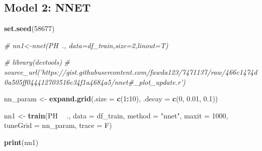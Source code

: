 \documentclass[]{report}
\newenvironment{Shaded}{\begin{snugshade}}{\end{snugshade}}
\newcommand{\CommentTok}[1]{\textcolor[rgb]{0.56,0.35,0.01}{\textit{#1}}}
\newcommand{\DataTypeTok}[1]{\textcolor[rgb]{0.13,0.29,0.53}{#1}}
\newcommand{\DecValTok}[1]{\textcolor[rgb]{0.00,0.00,0.81}{#1}}
\newcommand{\FloatTok}[1]{\textcolor[rgb]{0.00,0.00,0.81}{#1}}
\newcommand{\KeywordTok}[1]{\textcolor[rgb]{0.13,0.29,0.53}{\textbf{#1}}}
\newcommand{\NormalTok}[1]{#1}
\newcommand{\OperatorTok}[1]{\textcolor[rgb]{0.81,0.36,0.00}{\textbf{#1}}}
\newcommand{\StringTok}[1]{\textcolor[rgb]{0.31,0.60,0.02}{#1}}
\begin{document}
\hypertarget{model-2-nnet}{%
\subsection{Model 2: NNET}\label{model-2-nnet}}

\begin{Shaded}
\begin{Highlighting}[]
\KeywordTok{set.seed}\NormalTok{(}\DecValTok{58677}\NormalTok{)}

\CommentTok{# nn1<-nnet(PH~., data=df_train,size=2,linout=T)}

\CommentTok{# library(devtools)}
\CommentTok{# source_url('https://gist.githubusercontent.com/fawda123/7471137/raw/466c1474d0a505ff044412703516c34f1a4684a5/nnet#_plot_update.r')}

\NormalTok{nn_param <-}\StringTok{ }\KeywordTok{expand.grid}\NormalTok{(}\DataTypeTok{.size =} \KeywordTok{c}\NormalTok{(}\DecValTok{1}\OperatorTok{:}\DecValTok{10}\NormalTok{), }\DataTypeTok{.decay =} \KeywordTok{c}\NormalTok{(}\DecValTok{0}\NormalTok{, }\FloatTok{0.01}\NormalTok{, }
    \FloatTok{0.1}\NormalTok{))}

\NormalTok{nn1 <-}\StringTok{ }\KeywordTok{train}\NormalTok{(PH }\OperatorTok{~}\StringTok{ }\NormalTok{., }\DataTypeTok{data =}\NormalTok{ df_train, }\DataTypeTok{method =} \StringTok{"nnet"}\NormalTok{, }\DataTypeTok{maxit =} \DecValTok{1000}\NormalTok{, }
    \DataTypeTok{tuneGrid =}\NormalTok{ nn_param, }\DataTypeTok{trace =}\NormalTok{ F)}

\KeywordTok{print}\NormalTok{(nn1)}
\end{Highlighting}
\end{Shaded}
\end{document}
